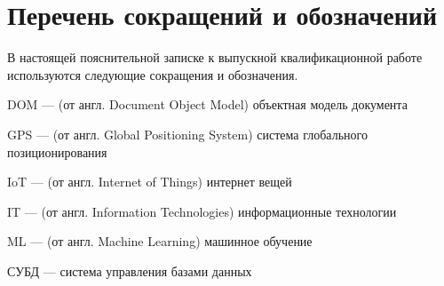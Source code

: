 \documentclass[../main]{subfiles}
\begin{document}
\newpage
{}
{}
\section*{Перечень сокращений и обозначений}

В настоящей пояснительной записке к выпускной квалификационной
работе используются следующие сокращения и обозначения.

\begin{termenum}
    \item DOM --- (от англ. Document Object Model) объектная модель документа
    \item GPS --- (от англ. Global Positioning System) система глобального позиционирования
    \item IoT --- (от англ. Internet of Things) интернет вещей
    \item IT --- (от англ. Information Technologies) информационные технологии
    \item ML --- (от англ. Machine Learning) машинное обучение
    \item СУБД --- система управления базами данных
\end{termenum}
\end{document}
